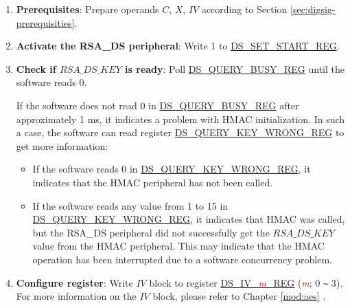 \documentclass[main\_\_EN.tex]{subfiles}
\begin{document}
\begin{enumerate}
    
    \item {\bfseries Prerequisites}: Prepare operands \begin{math}C\end{math}, \begin{math}X\end{math}, \begin{math}IV\end{math} according to Section \ref{sec:digsig-prerequisities}.
    
    \item {\bfseries Activate the RSA\_DS peripheral}: Write 1 to \hyperref[regdesc:DSSETSTARTREG]{DS\_SET\_START\_REG}.
    
    \item {\bfseries Check if \begin{math}RSA\_DS\_KEY\end{math} is ready}: Poll \hyperref[regdesc:DSQUERYBUSYREG]{DS\_QUERY\_BUSY\_REG} until the software reads 0.
    
    If the software does not read 0 in \hyperref[regdesc:DSQUERYBUSYREG]{DS\_QUERY\_BUSY\_REG} after approximately 1 ms, it indicates a problem with HMAC initialization. In such a case, the software can read register \hyperref[regdesc:DSQUERYKEYWRONGREG]{DS\_QUERY\_KEY\_WRONG\_REG} to get more information:
    
    \begin{itemize}
    
        \item If the software reads 0 in \hyperref[regdesc:DSQUERYKEYWRONGREG]{DS\_QUERY\_KEY\_WRONG\_REG}, it indicates that the HMAC peripheral has not been called.
        
        \item If the software reads any value from 1 to 15 in \hyperref[regdesc:DSQUERYKEYWRONGREG]{DS\_QUERY\_KEY\_WRONG\_REG}, it indicates that HMAC was called, but the RSA\_DS peripheral did not successfully get the \begin{math}RSA\_DS\_KEY\end{math} value from the HMAC peripheral. This may indicate that the HMAC operation has been interrupted due to a software concurrency problem.
        
    \end{itemize}
    
    \item {\bfseries Configure register}: Write \begin{math}IV\end{math} block to register \hyperref[regdesc:DSIVREG]{DS\_IV\_\textcolor{red}{\it{m}}\_REG} (\textcolor{red}{\it{m}}: 0 \verb+~+ 3). For more information on the \begin{math}IV\end{math} block, please refer to Chapter \ref{mod:aes} \textit{}.


\end{enumerate}
\end{document}
